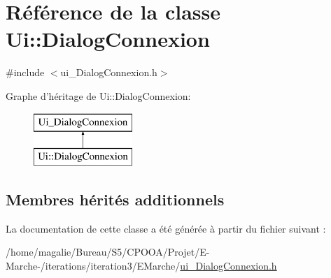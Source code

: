 \hypertarget{class_ui_1_1_dialog_connexion}{\section{Référence de la classe Ui\-:\-:Dialog\-Connexion}
\label{class_ui_1_1_dialog_connexion}
}


{\ttfamily \#include $<$ui\-\_\-\-Dialog\-Connexion.\-h$>$}

Graphe d'héritage de Ui\-:\-:Dialog\-Connexion\-:\begin{figure}[H]
\begin{center}
\leavevmode
\includegraphics[height=2.000000cm]{class_ui_1_1_dialog_connexion}
\end{center}
\end{figure}
\subsection*{Membres hérités additionnels}


La documentation de cette classe a été générée à partir du fichier suivant \-:\begin{DoxyCompactItemize}
\item 
/home/magalie/\-Bureau/\-S5/\-C\-P\-O\-O\-A/\-Projet/\-E-\/\-Marche-\//iterations/iteration3/\-E\-Marche/\hyperlink{ui___dialog_connexion_8h}{ui\-\_\-\-Dialog\-Connexion.\-h}\end{DoxyCompactItemize}
